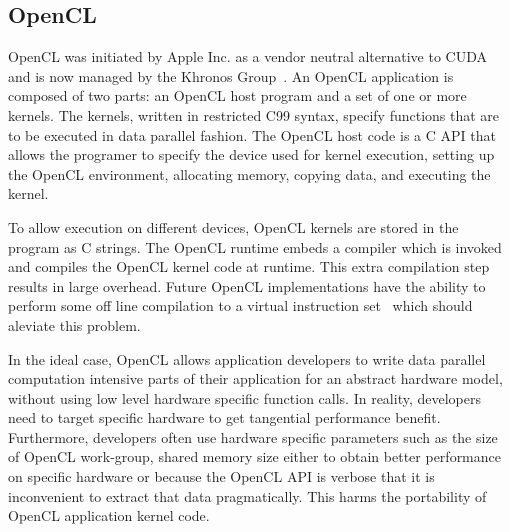 
\subsection{OpenCL}

OpenCL was initiated by Apple Inc. as a vendor neutral alternative
to CUDA and is now managed by the Khronos Group~\cite{OpenCL_kh}.
An OpenCL application is composed of two parts: an OpenCL host program and a
set of one or more kernels. The kernels, written in restricted C99 syntax,
specify functions that are to be executed in data parallel fashion. The OpenCL 
host code is a C API that allows the programer to specify the device used for
kernel execution, setting up the OpenCL environment, allocating memory, copying
data, and executing the kernel.

To allow execution on different devices, OpenCL kernels are stored in
	the program as C strings.
The OpenCL runtime embeds a compiler which is invoked and compiles the OpenCL kernel code at runtime.
This extra compilation step results in large overhead. Future OpenCL implementations
 have the ability to perform some off line compilation to a virtual instruction
set~\cite{SPIR} which should aleviate this problem.

In the ideal case, OpenCL allows application developers to write
data parallel computation intensive parts of their application for an abstract
hardware model, without using low level hardware specific function calls.
In reality, developers need to target specific hardware to get tangential
performance benefit. Furthermore, developers often use hardware specific 
parameters such as the size of OpenCL work-group, shared memory size either 
to obtain better performance on specific hardware or because the OpenCL API
is verbose that it is inconvenient to extract that data pragmatically.
This harms the portability of OpenCL application kernel code.

